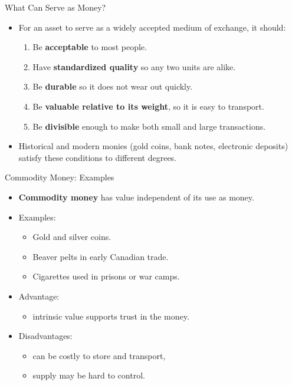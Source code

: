 \documentclass[aspectratio=169]{beamer}
\begin{document}
\begin{frame}{What Can Serve as Money?}
\transfade
\begin{itemize}
  \item For an asset to serve as a widely accepted medium of exchange, it should:
  \begin{enumerate}
    \item Be \textbf{acceptable} to most people.
    \item Have \textbf{standardized quality} so any two units are alike.
    \item Be \textbf{durable} so it does not wear out quickly.
    \item Be \textbf{valuable relative to its weight}, so it is easy to transport.
    \item Be \textbf{divisible} enough to make both small and large transactions.
  \end{enumerate}
  \item Historical and modern monies (gold coins, bank notes, electronic deposits) satisfy these conditions to different degrees.
\end{itemize}
\end{frame}

\begin{frame}{Commodity Money: Examples}
\transfade
\begin{itemize}
  \item \textbf{Commodity money} has value independent of its use as money.
  \item Examples:
  \begin{itemize}
    \item Gold and silver coins.
    \item Beaver pelts in early Canadian trade.
    \item Cigarettes used in prisons or war camps.
  \end{itemize}
  \item Advantage:
  \begin{itemize}
    \item intrinsic value supports trust in the money.
  \end{itemize}
  \item Disadvantages:
  \begin{itemize}
    \item can be costly to store and transport,
    \item supply may be hard to control.
  \end{itemize}
\end{itemize}
\end{frame}
\end{document}
